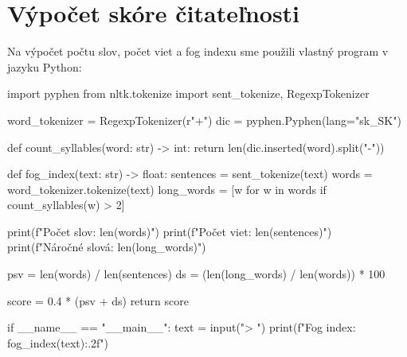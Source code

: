 \thispagestyle{empty}
\chapter{Výpočet skóre čitateľnosti}  \label{chapter:appendix-text-score}
\renewcommand*{\thepage}{C-\arabic{page}}

Na výpočet počtu slov, počet viet a fog indexu sme použili vlastný program v jazyku Python:
\begin{solution}
import pyphen
from nltk.tokenize import sent_tokenize, RegexpTokenizer

word_tokenizer = RegexpTokenizer(r"\w+")
dic = pyphen.Pyphen(lang="sk_SK")

def count_syllables(word: str) -> int:
    return len(dic.inserted(word).split("-"))

def fog_index(text: str) -> float:
    sentences = sent_tokenize(text)
    words = word_tokenizer.tokenize(text)
    long_words = [w for w in words if count_syllables(w) > 2]

    print(f"Počet slov: {len(words)}")
    print(f"Počet viet: {len(sentences)}")
    print(f"Náročné slová: {len(long_words)}")

    psv = len(words) / len(sentences)
    ds = (len(long_words) / len(words)) * 100

    score = 0.4 * (psv + ds)
    return score

if __name__ == "__main__":
    text = input("> ")
    print(f"Fog index: {fog_index(text):.2f}")
\end{solution}